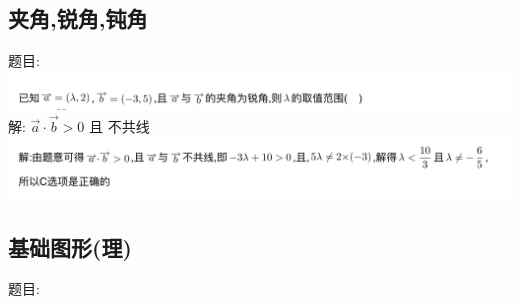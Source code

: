 \documentclass[hyperref, UTF8,11pt,a4paper]{ctexart} %
\begin{document}
\subsection{夹角,锐角,钝角}
{\color{red}  题目: } \\
\includegraphics[width=500pt]  {pic/xiangliang/jiajiaotimu.jpg} \\
解: {\color{blue}  $\vec{a} \cdot \vec{b}>0$ 且 不共线} \\
\includegraphics[width=500pt]  {pic/xiangliang/jiajiaojieda.jpg} \\


\subsection{基础图形(理)}
{\color{red}  题目: } \\


\end{document}
